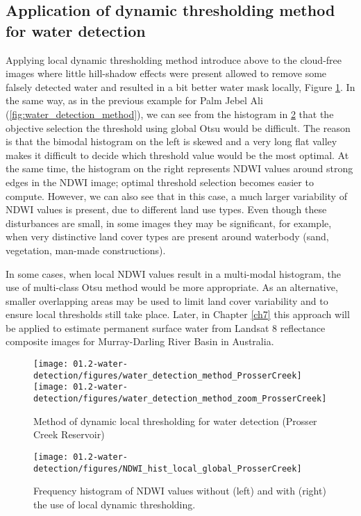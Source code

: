 \subsection{Application of dynamic thresholding method for water detection}

Applying local dynamic thresholding method introduce above to the cloud-free images where little hill-shadow effects were present allowed to remove some falsely detected water and resulted in a bit better water mask locally, Figure \ref{fig:water_detection_method_PC}. In the same way, as in the previous example for Palm Jebel Ali (\ref{fig:water_detection_method}), we can see from the histogram in \ref{fig:water_detection_method_local_water_hist_PC} that the objective selection the threshold using global Otsu would be difficult. The reason is that the bimodal histogram on the left is skewed and a very long flat valley makes it difficult to decide which threshold value would be the most optimal. At the same time, the histogram on the right represents NDWI values around strong edges in the NDWI image; optimal threshold selection becomes easier to compute. However, we can also see that in this case, a much larger variability of NDWI values is present, due to different land use types. Even though these disturbances are small, in some images they may be significant, for example, when very distinctive land cover types are present around waterbody (sand, vegetation, man-made constructions). 

In some cases, when local NDWI values result in a multi-modal histogram, the use of multi-class Otsu method would be more appropriate. As an alternative, smaller overlapping areas may be used to limit land cover variability and to ensure local thresholds still take place. Later, in Chapter \ref{ch7} this approach will be applied to estimate permanent surface water from Landsat 8 reflectance composite images for Murray-Darling River Basin in Australia. 

\begin{figure}[H]
	\centering
	\texttt{[image: 01.2-water-detection/figures/water\_detection\_method\_ProsserCreek]}
	\texttt{[image: 01.2-water-detection/figures/water\_detection\_method\_zoom\_ProsserCreek]}
	\caption{Method of dynamic local thresholding for water detection (Prosser Creek Reservoir)}
	\label{fig:water_detection_method_PC}
\end{figure}

\begin{figure}[H]
	\centering
	\texttt{[image: 01.2-water-detection/figures/NDWI\_hist\_local\_global\_ProsserCreek]}
	\caption{Frequency histogram of NDWI values without (left) and with (right) the use of local dynamic thresholding.}
	\label{fig:water_detection_method_local_water_hist_PC}
\end{figure}

